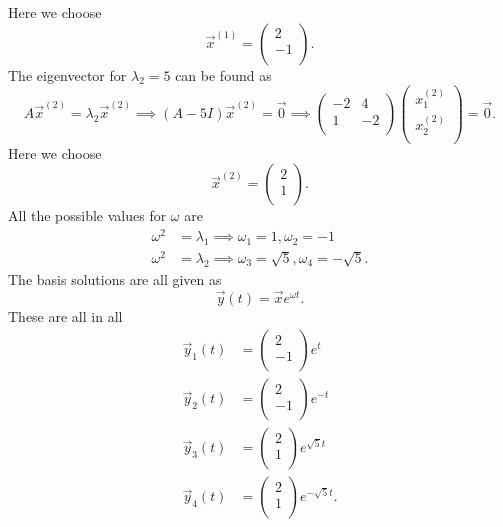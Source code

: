 Here we choose
\[ 
\Vec{x}^{(1)} = \begin{pmatrix}
2\\
-1\\
\end{pmatrix}
.\]
The eigenvector for $\lambda_2 = 5$ can be found as
\[ 
A \Vec{x}^{(2)} = \lambda_2 \Vec{x}^{(2)} \implies (A - 5I) \Vec{x}^{(2)} = \Vec{0} \implies \begin{pmatrix}
-2 & 4\\
1 & -2\\
\end{pmatrix} \begin{pmatrix}
x_1^{(2)}\\
x_2^{(2)}\\
\end{pmatrix} = \Vec{0}
.\]
Here we choose
\[ 
  \Vec{x}^{(2)} = \begin{pmatrix}
  2\\
  1\\
  \end{pmatrix}
.\]
All the possible values for $\omega$ are
\begin{align*}
  \omega^2 &= \lambda_1 \implies \omega_1 = 1, \omega_2 = -1 \\
  \omega^2 &= \lambda_2 \implies \omega_3 = \sqrt{5}, \omega_4 = - \sqrt{5}
.\end{align*}
The basis solutions are all given as
\[ 
\Vec{y}(t) = \Vec{x} e^{\omega t}
.\]
These are all in all
\begin{align*}
  \Vec{y}_1(t) &= \begin{pmatrix}
  2\\
  -1\\
  \end{pmatrix} e^{t} \\
  \Vec{y}_2(t) &= \begin{pmatrix}
  2\\
  -1\\
  \end{pmatrix} e^{-t} \\
  \Vec{y}_3(t) &= \begin{pmatrix}
  2\\
  1\\
  \end{pmatrix} e^{\sqrt{5}t} \\
    \Vec{y}_4(t) &= \begin{pmatrix}
    2\\
    1\\
    \end{pmatrix} e^{-\sqrt{5}t}
.\end{align*}
